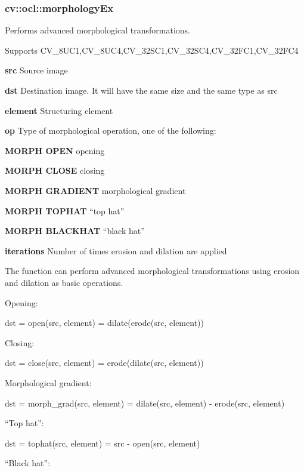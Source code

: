 \documentclass{article}
\begin{document}
\newpage

\subsubsection{cv::ocl::morphologyEx}
\label{subsubsec:mylabel41}
Performs advanced morphological transformations.

Supports CV{\_}8UC1,CV{\_}8UC4,CV{\_}32SC1,CV{\_}32SC4,CV{\_}32FC1,CV{\_}32FC4

\textbf{src }Source image

\textbf{dst }Destination image. It will have the same size and the same type
as src

\textbf{element }Structuring element

\textbf{op }Type of morphological operation, one of the following:

\textbf{MORPH OPEN }opening

\textbf{MORPH CLOSE }closing

\textbf{MORPH GRADIENT }morphological gradient

\textbf{MORPH TOPHAT }``top hat''

\textbf{MORPH BLACKHAT }``black hat''

\textbf{iterations }Number of times erosion and dilation are applied

The function can perform advanced morphological transformations using
erosion and dilation as basic operations.

Opening:

\begin{center}
dst = open(src, element) = dilate(erode(src, element))
\end{center}

Closing:

\begin{center}
dst = close(src, element) = erode(dilate(src, element))
\end{center}

Morphological gradient:

\begin{center}
dst = morph{\_}grad(src, element) = dilate(src, element) - erode(src,
element)
\end{center}

``Top hat'':

\begin{center}
dst = tophat(src, element) = src - open(src, element)
\end{center}

``Black hat'':
\end{document}
